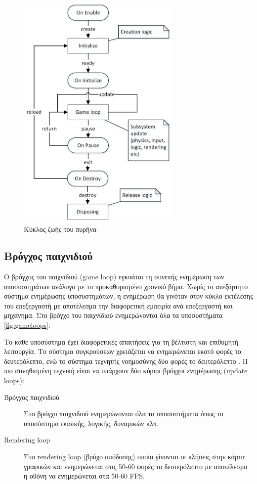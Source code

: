 	\begin{figure}[h!]
		\centering
		\includegraphics[width=80mm]{Images/core_lifecycle}
		\caption{Κύκλος ζωής του πυρήνα}
		\label{fig:corelifecycle}
	\end{figure}
		
	\subsection{Βρόγχος παιχνιδιού}
	Ο βρόγχος του παιχνιδιού (game loop) εγκυάται τη συνεπής ενημέρωση των υποσυστημάτων ανάλογα με το προκαθορισμένο χρονικό βήμα. Χωρίς το ανεξάρτητο σύστημα ενημέρωσης υποσυστημάτων, η ενημέρωση θα γινόταν στον κύκλο εκτέλεσης του επεξεργαστή με αποτέλεσμα την διαφορετική εμπειρία ανά επεξεργαστή και μηχάνημα. Στο βρόγχο του παιχνιδιού ενημερώνονται όλα τα υποσυστήματα \ref{fig:gameloops}.
	
	Το κάθε υποσύστημα έχει διαφορετικές απαιτήσεις για τη βέλτιστη και επιθυμητή λειτουργία. Το σύστημα συγκρούσεων χρειάζεται να ενημερώνεται εκατό φορές το δευτερόλεπτο, ενώ το σύστημα τεχνητής νοημοσύνης δύο φορές το δευτερόλεπτο \cite{gregory2009game}. Η πιο συνηθισμένη τεχνική είναι να υπάρχουν δύο κύριοι βρόγχοι ενημέρωσης (update loops):
	\begin{description}
	\item [Βρόγχος παιχνιδιού] Στο βρόγχο παιχνιδιού ενημερώνονται όλα τα υποσυστήματα όπως το υποσύστημα φυσικής, λογικής, δυναμικών κλπ.
	\item [Rendering loop] Στο rendering loop (βρόχο απόδοσης) οποίο γίνονται οι κλήσεις στην κάρτα γραφικών και ενημερώνεται στις 50-60 φορές το δευτερόλεπτο με αποτέλεσμα η οθόνη να ενημερώνεται στα 50-60 \gls{FPS}.
	\end{description}
	
